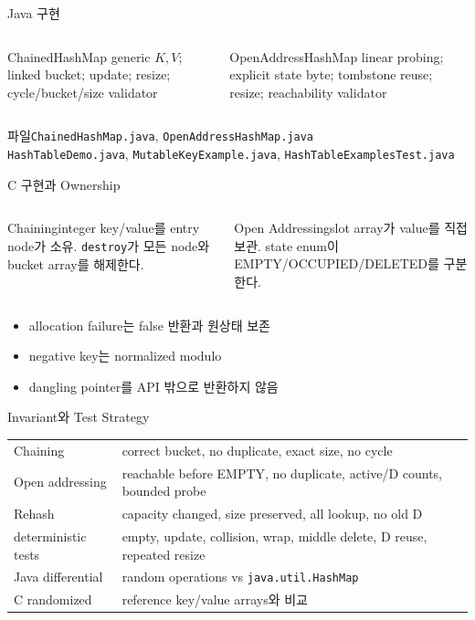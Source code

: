 \begin{frame}{Java 구현}
\begin{columns}[T]
\begin{block}{ChainedHashMap}
generic $K,V$; linked bucket; update; resize; cycle/bucket/size validator
\end{block}
\begin{block}{OpenAddressHashMap}
linear probing; explicit state byte; tombstone reuse; resize; reachability validator
\end{block}
\end{columns}
\begin{exampleblock}{파일}\texttt{ChainedHashMap.java}, \texttt{OpenAddressHashMap.java}\\
\texttt{HashTableDemo.java}, \texttt{MutableKeyExample.java}, \texttt{HashTableExamplesTest.java}\end{exampleblock}
\end{frame}
\begin{frame}{C 구현과 Ownership}
\begin{columns}[T]
\begin{block}{Chaining}integer key/value를 entry node가 소유. \texttt{destroy}가 모든 node와 bucket array를 해제한다.\end{block}
\begin{block}{Open Addressing}slot array가 value를 직접 보관. state enum이 EMPTY/OCCUPIED/DELETED를 구분한다.\end{block}
\end{columns}
\begin{itemize}\item allocation failure는 false 반환과 원상태 보존\item negative key는 normalized modulo\item dangling pointer를 API 밖으로 반환하지 않음\end{itemize}
\end{frame}
\begin{frame}{Invariant와 Test Strategy}
\scriptsize\begin{tabular}{ll}\toprule
Chaining&correct bucket, no duplicate, exact size, no cycle\\
Open addressing&reachable before EMPTY, no duplicate, active/D counts, bounded probe\\
Rehash&capacity changed, size preserved, all lookup, no old D\\\midrule
deterministic tests&empty, update, collision, wrap, middle delete, D reuse, repeated resize\\
Java differential&random operations vs \texttt{java.util.HashMap}\\
C randomized&reference key/value arrays와 비교\\\bottomrule
\end{tabular}
\end{frame}
